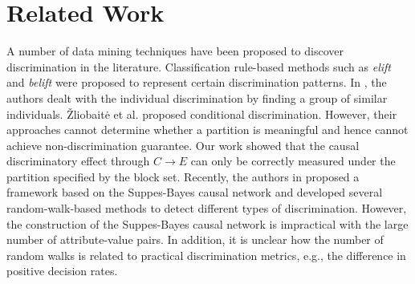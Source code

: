 \documentclass[twoside,leqno,twocolumn]{article}
\begin{document}

\section{Related Work}\label{sec:rw}
A number of data mining techniques have been proposed to discover discrimination in the literature. Classification rule-based methods such as \emph{elift} \cite{pedreshi2008discrimination} and \emph{belift} \cite{mancuhan2014combating} were proposed to represent certain discrimination patterns. In \cite{luong2011k,zhang2016situation}, the authors dealt with the individual discrimination by finding a group of similar individuals. \v{Z}liobait\.{e} et al. \cite{zliobaite2011handling} proposed conditional discrimination. However, their approaches cannot determine whether a partition is meaningful and hence cannot achieve non-discrimination guarantee. Our work showed that the causal discriminatory effect through $C \rightarrow E$ can only be correctly measured under the partition specified by the block set. Recently, the authors in \cite{DBLP:journals/corr/BonchiHMR15} proposed a framework based on the Suppes-Bayes causal network and developed several random-walk-based methods to detect different types of discrimination. However, the construction of the Suppes-Bayes causal network is impractical with the large number of attribute-value pairs. In addition, it is unclear how the number of random walks is related to practical discrimination metrics, e.g., the difference in positive decision rates.
\end{document}
